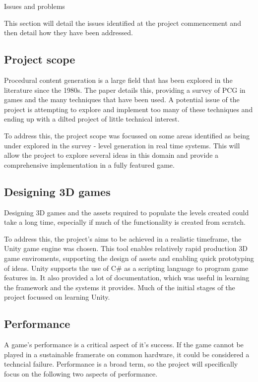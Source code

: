 \documentclass[progress]{cmpreport}
\begin{document}
\begin{section}{Issues and problems}

This section will detail the issues identified at the project commencement and then detail how they have been addressed.

\subsection{Project scope}
Procedural content generation is a large field that has been explored in the literature since the 1980s. The paper \cite{Hendrikx:2013:PCG:2422956.2422957} details this, providing a survey of PCG in games and the many techniques that have been used. A potential issue of the project is attempting to explore and implement too many of these techniques and ending up with a dilted project of little technical interest. 

To address this, the project scope was focussed on some areas identified as being under explored in the survey - level generation in real time systems. This will allow the project to explore several ideas in this domain and provide a comprehensive implementation in a fully featured game.

\subsection{Designing 3D games}
Designing 3D games and the assets required to populate the levels created could take a long time, especially if much of the functionality is created from scratch. 

To address this, the project's aims to be achieved in a realistic timeframe, the Unity game engine was chosen. This tool enables relatively rapid production 3D game enviroments, supporting the design of assets and enabling quick prototyping of ideas. Unity supports the use of C\# as a scripting language to program game features in. It also provided a lot of documentation, which was useful in learning the framework and the systems it provides. Much of the initial stages of the project focussed on learning Unity.

\subsection{Performance}
A game's performance is a critical aspect of it's success. If the game cannot be played in a sustainable framerate on common hardware, it could be considered a techncial failure. Performance is a broad term, so the project will specifically focus on the following two aspects of performance.


\end{section}
\end{document}
